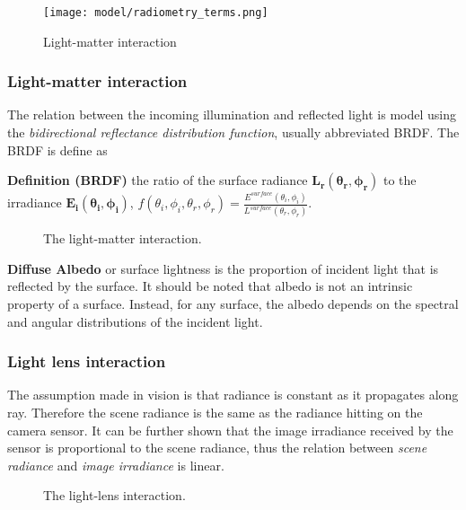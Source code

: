 \begin{figure}[!ht]
\centering
\texttt{[image: model/radiometry\_terms.png]}
\caption{Light-matter interaction}
\label{fig:radiometry_terms}
\end{figure}

\subsubsection{Light-matter interaction}
The relation between the incoming illumination and reflected light is model using the \textit{bidirectional reflectance distribution function}, usually abbreviated BRDF. The BRDF is define as

\textbf{Definition (BRDF)} the ratio of the surface radiance $\mathbf{L_r(\theta_r, \phi_r)}$ to the irradiance $\mathbf{E_i(\theta_i, \phi_i)}$, \ie $f(\theta_i, \phi_i, \theta_r, \phi_r)=\frac{E^{surface}(\theta_i, \phi_i)}{L^{surface}(\theta_r, \phi_r)}$.

\begin{figure}[!ht]
\centering
{}
\caption{The light-matter interaction.}
\label{fig:light_matter_interact}
\end{figure}

\textbf{Diffuse Albedo} or surface lightness is the proportion of incident light that is reflected by the surface. It should be noted that albedo is not an intrinsic property of a surface. Instead, for any surface, the albedo depends on the spectral and angular distributions of the incident light.

\subsubsection{Light lens interaction}
The assumption made in vision is that radiance is constant as it propagates along ray. Therefore the scene radiance is the same as the radiance hitting on the camera sensor. It can be further shown that the image irradiance received by the sensor is proportional to the scene radiance, thus the relation between \textit{scene radiance} and \textit{image irradiance} is linear.
\begin{figure}[!ht]
\centering
{}
\caption{The light-lens interaction.}
\label{fig:light_lens_interact}
\end{figure}

